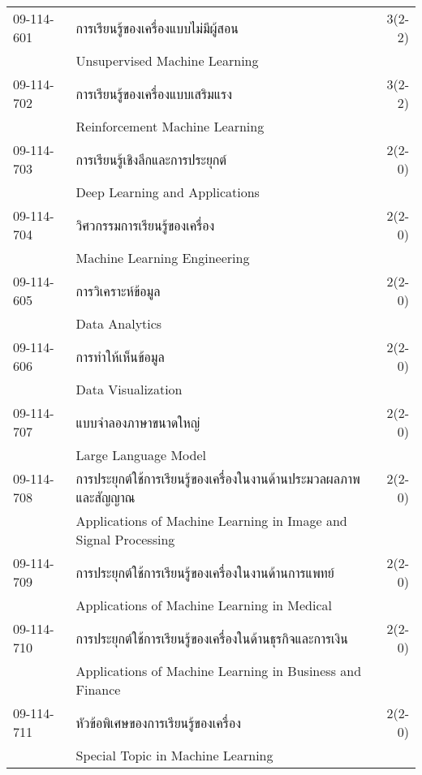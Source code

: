 \begin{longtable}{p{}p{}r{}}
09-114-601 & การเรียนรู้ของเครื่องแบบไม่มีผู้สอน & 3(2-2)\\
& Unsupervised Machine Learning & \\[3mm]
09-114-702 & การเรียนรู้ของเครื่องแบบเสริมแรง & 3(2-2)\\
& Reinforcement Machine Learning & \\[3mm]
09-114-703 & การเรียนรู้เชิงลึกและการประยุกต์   & 2(2-0)\\
& Deep Learning and Applications & \\[3mm]
09-114-704 & วิศวกรรมการเรียนรู้ของเครื่อง & 2(2-0)\\
& Machine Learning Engineering & \\[3mm]
09-114-605 & การวิเคราะห์ข้อมูล & 2(2-0)\\
& Data Analytics & \\[3mm]
09-114-606 & การทำให้เห็นข้อมูล & 2(2-0)\\
& Data Visualization & \\[3mm]
09-114-707 & แบบจำลองภาษาขนาดใหญ่ & 2(2-0)\\
& Large Language Model & \\[3mm]
09-114-708 & การประยุกต์ใช้การเรียนรู้ของเครื่องในงานด้านประมวลผลภาพและสัญญาณ & 2(2-0)\\
& Applications of Machine Learning in Image and Signal Processing & \\[3mm]
09-114-709 & การประยุกต์ใช้การเรียนรู้ของเครื่องในงานด้านการแพทย์  & 2(2-0)\\
& Applications of Machine Learning in Medical & \\[3mm]
09-114-710 & การประยุกต์ใช้การเรียนรู้ของเครื่องในด้านธุรกิจและการเงิน & 2(2-0)\\
& Applications of Machine Learning in Business and Finance & \\[3mm]
09-114-711 & หัวข้อพิเศษของการเรียนรู้ของเครื่อง  & 2(2-0)\\
& Special Topic in Machine Learning & \\[3mm]
\end{longtable}
